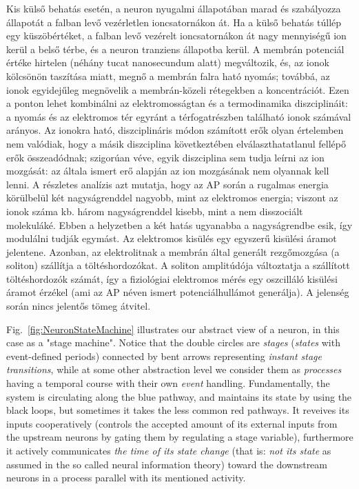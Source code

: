 Kis külső behatás esetén, a neuron nyugalmi állapotában marad és szabályozza állapotát a falban levő vezérletlen ioncsatornákon át.
Ha a külső behatás túllép egy küszöbértéket, a falban levő vezérelt 
ioncsatornákon át nagy mennyiségű ion kerül a belső térbe,
és a neuron tranziens állapotba kerül.
A membrán potenciál értéke hirtelen (néhány tucat nanosecundum alatt)
megváltozik, és, az ionok kölcsönön taszítása miatt, megnő a
membrán falra ható nyomás; továbbá, az ionok egyidejűleg megnövelik 
a membrán-közeli rétegekben a koncentrációt.
Ezen a ponton lehet kombinálni az elektromosságtan és a termodinamika
diszciplináit: a nyomás és az elektromos tér egyránt a térfogatrészben
található ionok számával arányos.
Az ionokra ható, diszciplináris módon számított erők olyan értelemben
nem valódiak, hogy a másik diszciplina következtében elválaszthatatlanul fellépő erők összeadódnak; szigorúan véve, egyik diszciplina sem tudja
leírni az ion mozgását: az általa ismert erő alapján az ion mozgásának nem olyannak kell lenni. 
A részletes analízis azt mutatja, hogy az \gls{AP} során a
rugalmas energia körülbelül két nagyságrenddel nagyobb,
mint az elektromos energia; viszont az ionok száma kb. három nagyságrenddel kisebb, mint a nem disszociált molekuláké.
Ebben a helyzetben a két hatás ugyanabba a nagyságrendbe esik,
így modulálni tudják egymást.
Az elektromos kisülés egy egyszerű kisülési áramot jelentene.
Azonban, az elektrolitnak a membrán által generált rezgőmozgása (a soliton) szállítja a töltéshordozókat.
A soliton amplitúdója változtatja a szállított töltéshordozók számát,
így a fiziológiai elektromos mérés egy oszcilláló kisülési áramot
érzékel (ami az \gls{AP} néven ismert potenciálhullámot generálja).
A jelenség során nincs jelentős tömeg átvitel.
\fi

\ifx\magyar\undefined


Fig.~\ref{fig:NeuronStateMachine} illustrates our abstract view of a neuron,
in this case as a "stage machine".
Notice that the double circles are \textit{stages} (\textit{states} with event-defined periods) connected 
by bent arrows representing \textit{instant stage transitions}, while at some other abstraction level we consider them as \textit{processes} having a temporal course
with their own \textit{event} handling. Fundamentally, the system is circulating along the blue pathway, and maintains its state by using 
the black loops, but sometimes it takes the less common red pathways.
It reveives its inputs cooperatively
(controls the accepted amount of its external inputs from the upstream neurons by gating them by regulating a stage variable), furthermore
it actively communicates \textit{the time of its state change} (that is: \textit{not its state} as assumed in the so called neural information theory) toward the downstream neurons in a process
parallel with its mentioned activity.
\else
\fi

